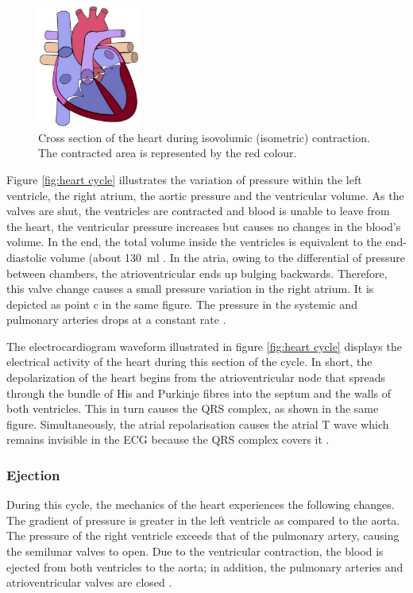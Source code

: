 \begin{figure}[!htpb]
	\centering
	\includegraphics[height=4cm,keepaspectratio]{figure_3}   
	\caption[Heart during isovolumic (isometric) contaction]{Cross section of the heart during isovolumic (isometric) contraction. The contracted area is represented by the red colour.}
	\label{fig:heart isovolumic}
\end{figure}

Figure \ref{fig:heart cycle} illustrates the variation of pressure within the left ventricle, the right atrium, the aortic pressure and the ventricular volume. As the valves are shut, the ventricles are contracted and blood is unable to leave from the heart, the ventricular pressure increases but causes no changes in the blood's volume. In the end, the total volume inside the ventricles is equivalent to the end-diastolic volume (about \SI{130}{\milli\litre} \cite{fukuta2008cardiac}. In the atria, owing to the differential of pressure between chambers, the atrioventricular ends up bulging backwards. Therefore, this valve change causes a small pressure variation in the right atrium. It is depicted as point c in the same figure. The pressure in the systemic and pulmonary arteries drops at a constant rate \cite{Hall:2015aa}. 

The electrocardiogram waveform illustrated in figure \ref{fig:heart cycle} displays the electrical activity of the heart during this section of the cycle. In short, the depolarization of the heart begins from the atrioventricular node that spreads through the bundle of His and Purkinje fibres into the septum and the walls of both ventricles. This in turn causes the QRS complex, as shown in the same figure. Simultaneously, the atrial repolarisation causes the atrial T wave which remains invisible in the ECG because the QRS complex covers it \cite{Hall:2015aa}.

\subsubsection{Ejection}
During this cycle, the mechanics of the heart experiences the following changes. The gradient of pressure is greater in the left ventricle as compared to the aorta. The pressure of the right ventricle exceeds that of the pulmonary artery, causing the semilunar valves to open. Due to the ventricular contraction, the blood is ejected from both ventricles to the aorta; in addition, the pulmonary arteries and atrioventricular valves are closed \cite{Hall:2015aa}.


